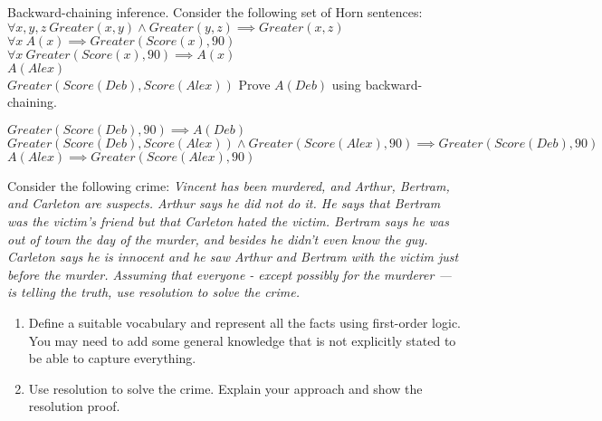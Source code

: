 \documentclass[12pt]{article}
\newenvironment{problem}[2][Problem]{\begin{trivlist}
\item[\hskip \labelsep {\bfseries #1}\hskip \labelsep {\bfseries #2.}]}{\end{trivlist}}
\begin{document}
\begin{problem}{4}
	Backward-chaining inference. Consider the following set of Horn sentences:
	$\forall x,y,z ~ Greater(x,y) \wedge Greater(y,z) \implies Greater(x,z)$ \\
	$\forall x ~ A(x) \implies Greater(Score(x),90)$ \\
	$\forall x ~ Greater(Score(x),90) \implies A(x)$ \\
	$A(Alex)$ \\
	$Greater(Score(Deb),Score(Alex))$
	Prove $A(Deb)$ using backward-chaining.

	\vspace{0.25cm}
	$Greater(Score(Deb),90) \implies A(Deb)$ \\
	$Greater(Score(Deb),Score(Alex)) \wedge Greater(Score(Alex),90) \implies Greater(Score(Deb),90)$ \\
	$A(Alex) \implies Greater(Score(Alex),90)$
\end{problem}
\begin{problem}{4}
	Consider the following crime:
	\textit{
		Vincent has been murdered, and Arthur, Bertram, and Carleton are suspects.
		Arthur says he did not do it.
		He says that Bertram was the victim's friend but that Carleton hated the victim.
		Bertram says he was out of town the day of the murder, and besides he didn't even know the guy.
		Carleton says he is innocent and he saw Arthur and Bertram with the victim just before the murder.
		Assuming that everyone - except possibly for the murderer --- is telling the truth,
		use resolution to solve the crime.
	}
	\begin{enumerate}
		\item Define a suitable vocabulary and represent all the facts using first-order logic.
			You may need to add some general knowledge that is not explicitly stated to be able to
			capture everything.
		\item Use resolution to solve the crime.
			Explain your approach and show the resolution proof.
	\end{enumerate}
\end{problem}
\end{document}
